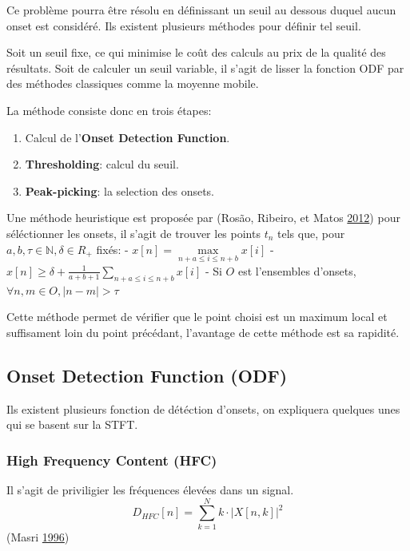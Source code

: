 \documentclass[french,]{article}
\providecommand{\tightlist}{%
  \setlength{\itemsep}{0pt}\setlength{\parskip}{0pt}}
\begin{document}
Ce problème pourra être résolu en définissant un seuil au dessous duquel
aucun onset est considéré. Ils existent plusieurs méthodes pour définir
tel seuil.

Soit un seuil fixe, ce qui minimise le coût des calculs au prix de la
qualité des résultats. Soit de calculer un seuil variable, il s'agit de
lisser la fonction ODF par des méthodes classiques comme la moyenne
mobile.

La méthode consiste donc en trois étapes:

\begin{enumerate}
\def\labelenumi{\arabic{enumi}.}
\tightlist
\item
  Calcul de l'\textbf{Onset Detection Function}.
\item
  \textbf{Thresholding}: calcul du seuil.
\item
  \textbf{Peak-picking}: la selection des onsets.
\end{enumerate}

Une méthode heuristique est proposée par (Rosão, Ribeiro, et Matos
\protect\hyperlink{ref-ismir}{2012}) pour séléctionner les onsets, il
s'agit de trouver les points \(t_n\) tels que, pour
\(a,b,\tau\in\mathbb{N}, \delta\in{R_+}\) fixés: -
\(x[n] = \max\limits_{n+a \leq i\leq n + b} x[i]\) -
\(x[n] \geq \delta + \frac{1}{a+b+1}\sum\limits_{n+a \leq i\leq n + b} x[i]\)
- Si \(O\) est l'ensembles d'onsets,
\(\forall n,m\in O, \lvert n - m \rvert > \tau\)

Cette méthode permet de vérifier que le point choisi est un maximum
local et suffisament loin du point précédant, l'avantage de cette
méthode est sa rapidité.

\hypertarget{onset-detection-function-odf}{%
\subsection{Onset Detection Function
(ODF)}\label{onset-detection-function-odf}}

Ils existent plusieurs fonction de détéction d'onsets, on expliquera
quelques unes qui se basent sur la STFT.

\hypertarget{high-frequency-content-hfc}{%
\subsubsection{High Frequency Content
(HFC)}\label{high-frequency-content-hfc}}

Il s'agit de priviligier les fréquences élevées dans un signal.
\[ D_{HFC}[n] = \sum\limits_{k=1}^{N}k\cdot\left\lvert X[n,k]\right\rvert^2 \]
(Masri \protect\hyperlink{ref-hfc}{1996})
\end{document}
